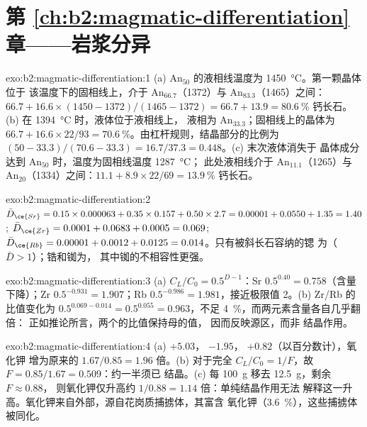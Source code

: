 \section*{第 \ref{ch:b2:magmatic-differentiation} 章——岩浆分异}

\begin{solution}{exo:b2:magmatic-differentiation:1}
(a) An$_{50}$ 的液相线温度为 \qty{1450}{\celsius}。第一颗晶体位于
该温度下的固相线上，介于 An$_{66.7}$（1372）与 An$_{83.3}$（1465）之间：
$66.7 + 16.6\times(1450 - 1372)/(1465 - 1372) = 66.7 + 13.9 = \qty{80.6}{\percent}$
钙长石。(b) 在 \qty{1394}{\celsius} 时，液体位于液相线上，
液相为 An$_{33.3}$；固相线上的晶体为 $66.7 + 16.6\times22/93 =
\qty{70.6}{\percent}$。由杠杆规则，结晶部分的比例为 $(50 -
33.3)/(70.6 - 33.3) = 16.7/37.3 = 0.448$。(c) 末次液体消失于
晶体成分达到 An$_{50}$ 时，温度为固相线温度 \qty{1287}{\celsius}；
此处液相线介于 An$_{11.1}$（1265）与 An$_{20}$（1334）之间：$11.1 +
8.9\times22/69 = \qty{13.9}{\percent}$ 钙长石。
\end{solution}

\begin{solution}{exo:b2:magmatic-differentiation:2}
$\bar D_{\ce{Sr}} = 0.15\times0.000063 + 0.35\times0.157 + 0.50\times2.7 = 0.00001 +
0.0550 + 1.35 = 1.40$; $\bar D_{\ce{Zr}} = 0.0001 + 0.0683 + 0.0005 = 0.069$;
$\bar D_{\ce{Rb}} = 0.00001 + 0.0012 + 0.0125 = 0.014$。只有被斜长石容纳的锶
为（$\bar D > 1$）；锆和铷为，
其中铷的不相容性更强。
\end{solution}

\begin{solution}{exo:b2:magmatic-differentiation:3}
(a) $C_L/C_0 = 0.5^{D-1}$：Sr $0.5^{0.40} = 0.758$（含量下降）；Zr $0.5^{-0.931} =
1.907$；Rb $0.5^{-0.986} = 1.981$，接近极限值 2。(b) Zr/Rb 的比值变化为
$0.5^{0.069 - 0.014} = 0.5^{0.055} = 0.963$，不足 \qty{4}{\percent}，而两元素含量各自几乎翻倍：
正如推论所言，两个的比值保持母的值，
因而反映源区，而非
结晶作用。
\end{solution}

\begin{solution}{exo:b2:magmatic-differentiation:4}
(a)  $+5.03$， $-1.95$， $+0.82$（以百分数计），氧化钾
增为原来的 $1.67/0.85 = 1.96$ 倍。(b) 对于完全
$C_L/C_0 = 1/F$，故 $F = 0.85/1.67 = 0.509$：约一半须已
结晶。(c) 每 \qty{100}{g} 移去 \qty{12.5}{g}，剩余 $F \approx 0.88$，
则氧化钾仅升高约 $1/0.88 = 1.14$ 倍：单纯结晶作用无法
解释这一升高。氧化钾来自外部，源自花岗质捕掳体，其富含
氧化钾（\qty{3.6}{\percent}），这些捕掳体被同化。
\end{solution}

